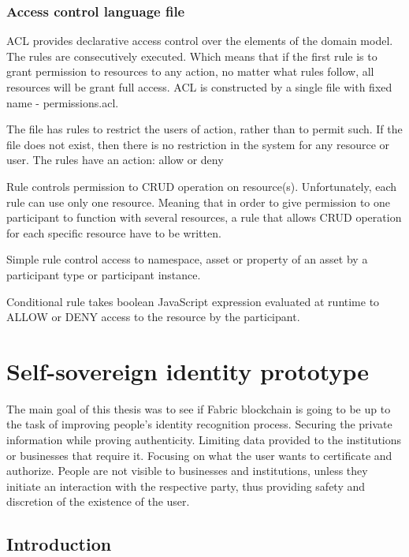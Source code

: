 \documentclass[a4paper,11pt]{report}
\begin{document}
\subsection{Access control language file}
ACL provides declarative access control over the elements of the domain model. The rules are consecutively executed. Which means that if the first rule is to grant permission to resources to any action, no matter what rules follow, all resources will be grant full access. ACL is constructed by a single file with fixed name - permissions.acl. 

The file has rules to restrict the users of action, rather than to permit such. If the file does not exist, then there is no restriction in the system for any resource or user. The rules have an action: allow or deny

Rule controls permission to CRUD operation on resource(s). Unfortunately, each rule can use only one resource. Meaning that in order to give permission to one participant to function with several resources, a rule that allows CRUD operation for each specific resource have to be written.  

Simple rule control access to namespace, asset or property of an asset by a participant type or participant instance.

Conditional rule takes boolean JavaScript expression evaluated at runtime to ALLOW or DENY access to the resource by the participant.


\chapter{Self-sovereign identity prototype}
\label{usecase}

The main goal of this thesis was to see if Fabric blockchain is going to be up to the task of improving people’s identity recognition process. Securing the private information while proving authenticity. Limiting data provided to the institutions or businesses that require it. Focusing on what the user wants to certificate and authorize. People are not visible to businesses and institutions, unless they initiate an interaction with the respective party, thus providing safety and discretion of the existence of the user.  
  
\section{Introduction}
\end{document}
